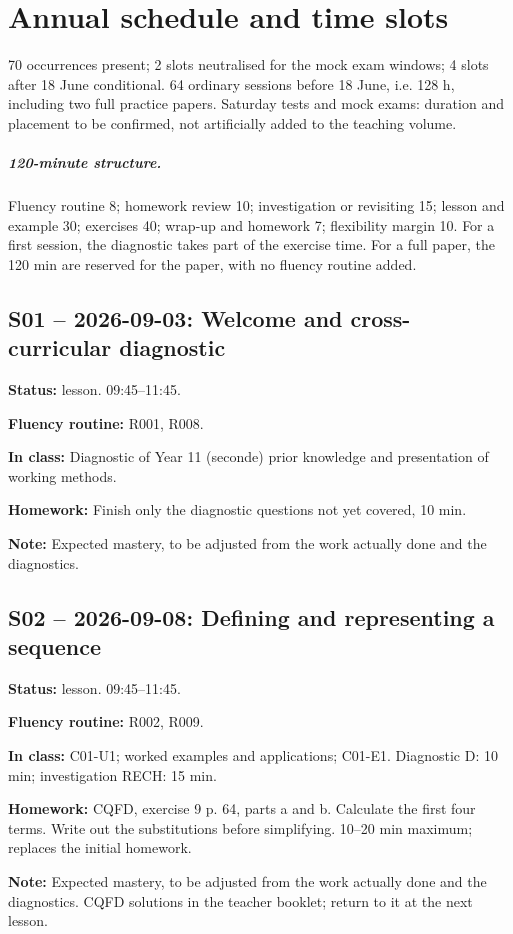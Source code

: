 \chapter{Annual schedule and time slots}\label{ANNUEL}
70 occurrences present; 2 slots neutralised for the mock exam windows; 4 slots after 18 June conditional. 64 ordinary sessions before 18 June, i.e. 128 h, including two full practice papers. Saturday tests and mock exams: duration and placement to be confirmed, not artificially added to the teaching volume.
\paragraph{120-minute structure.} Fluency routine 8; homework review 10; investigation or revisiting 15; lesson and example 30; exercises 40; wrap-up and homework 7; flexibility margin 10. For a first session, the diagnostic takes part of the exercise time. For a full paper, the 120 min are reserved for the paper, with no fluency routine added.
\section*{S01 -- 2026-09-03: Welcome and cross-curricular diagnostic}
\textbf{Status:} lesson. 09:45–11:45.\par\textbf{Fluency routine:} R001, R008.\par\textbf{In class:} Diagnostic of Year 11 (seconde) prior knowledge and presentation of working methods.\par\textbf{Homework:} Finish only the diagnostic questions not yet covered, 10 min.\par\textbf{Note:} Expected mastery, to be adjusted from the work actually done and the diagnostics.
\section*{S02 -- 2026-09-08: Defining and representing a sequence}
\textbf{Status:} lesson. 09:45–11:45.\par\textbf{Fluency routine:} R002, R009.\par\textbf{In class:} C01-U1; worked examples and applications; C01-E1. Diagnostic D: 10 min; investigation RECH: 15 min.\par\textbf{Homework:} CQFD, exercise 9 p. 64, parts a and b. Calculate the first four terms. Write out the substitutions before simplifying. 10–20 min maximum; replaces the initial homework.\par\textbf{Note:} Expected mastery, to be adjusted from the work actually done and the diagnostics. CQFD solutions in the teacher booklet; return to it at the next lesson.
